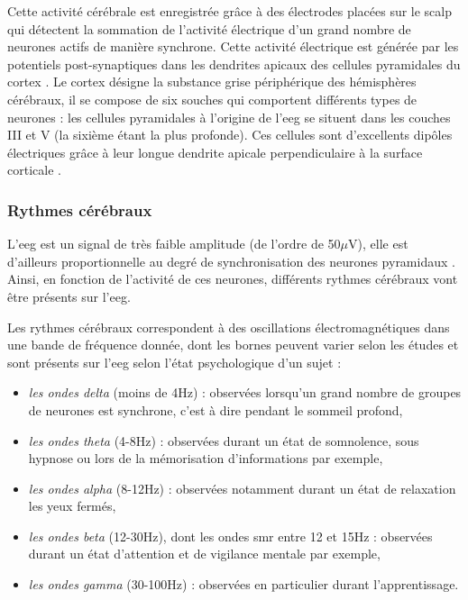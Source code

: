 Cette activité cérébrale est enregistrée grâce à des électrodes placées sur le scalp qui détectent la sommation de l'activité électrique d'un grand nombre de neurones actifs de manière synchrone.
Cette activité électrique est générée par les potentiels post-synaptiques dans les dendrites apicaux des cellules pyramidales du cortex \citep{Hallez2007}. Le cortex désigne 
la substance grise périphérique des hémisphères cérébraux, il se compose de six souches qui comportent différents types de neurones : les cellules pyramidales à l'origine de l'\gls{eeg} 
se situent dans les couches III et V (la sixième étant la plus profonde). Ces cellules sont d'excellents dipôles électriques grâce à leur longue dendrite apicale perpendiculaire 
à la surface corticale \citep{Bekkers2011}. 

\subsubsection{Rythmes cérébraux}

L'\gls{eeg} est un signal de très faible amplitude (de l'ordre de 50$\mu$V), elle est d'ailleurs proportionnelle au degré de synchronisation des neurones pyramidaux \citep{Hallez2007}. 
Ainsi, en fonction de l'activité de ces neurones, différents rythmes cérébraux vont être présents sur l'\gls{eeg}. 

Les rythmes cérébraux correspondent à des oscillations électromagnétiques dans une bande de fréquence donnée, dont les bornes peuvent varier selon les études et sont présents sur l'\gls{eeg}
selon l'état psychologique d'un sujet \citep{Marzbani2016} :  
\renewcommand{\labelitemi}{$\bullet$}
\renewcommand{\labelitemii}{$\cdot$}
\begin{itemize}
\item \emph{les ondes delta} (moins de 4Hz) : observées lorsqu'un grand nombre de groupes de neurones est synchrone, c'est à dire pendant le sommeil profond,
\item \emph{les ondes theta} (4-8Hz) : observées durant un état de somnolence, sous hypnose ou lors de la mémorisation d'informations par exemple,
\item \emph{les ondes alpha} (8-12Hz) : observées notamment durant un état de relaxation les yeux fermés,
\item \emph{les ondes beta} (12-30Hz), dont les ondes \gls{smr} entre 12 et 15Hz : observées durant un état d'attention et de vigilance mentale par exemple,
\item \emph{les ondes gamma} (30-100Hz) : observées en particulier durant l'apprentissage.
\end{itemize}

